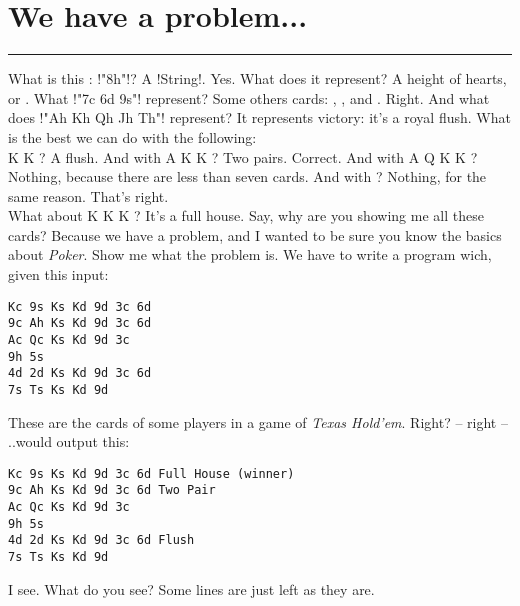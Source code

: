 \newpage
\section{We have a problem...} %
\vspace{10cm}
\hrule

\lhQ What is this : \il!"8h"!?
\lhA A \il!String!.
\lhN Yes. What does it represent?
\lhA A height of hearts, or .
\lhN What \il!"7c 6d 9s"! represent?
\lhA Some others cards: , , and .
\lhN Right. And what does \il!"Ah Kh Qh Jh Th"! represent?
\lhA It represents victory: it's a royal flush.
\lhN What is the best we can do with the following: \\
   \spades K \diamonds K   ?
\lhA A flush.
\lhN And with  \hearts A \spades K \diamonds K   ?
\lhA Two pairs.
\lhN Correct. And with \clubs A \clubs Q \spades K \diamonds K  ?
\lhA Nothing, because there are less than seven cards.
\lhN And with  ?
\lhA Nothing, for the same reason.
\lhN That's right. \\
What about \clubs K  \spades K \diamonds K    ?
\lhA It's a full house. Say, why are you showing me all these cards?
\lhN Because we have a problem, and I wanted to be sure you know the basics about \emph{Poker}.
\lhA Show me what the problem is.
\lhN We have to write a program wich, given this input:
\begin{verbatim}
Kc 9s Ks Kd 9d 3c 6d
9c Ah Ks Kd 9d 3c 6d
Ac Qc Ks Kd 9d 3c
9h 5s
4d 2d Ks Kd 9d 3c 6d
7s Ts Ks Kd 9d
\end{verbatim}
\hspace*{\fill} 
\lhA These are the cards of some players in a game of \emph{Texas Hold'em}. Right?
\lhN -- right -- ..would output this:
\begin{verbatim}
Kc 9s Ks Kd 9d 3c 6d Full House (winner)
9c Ah Ks Kd 9d 3c 6d Two Pair
Ac Qc Ks Kd 9d 3c 
9h 5s 
4d 2d Ks Kd 9d 3c 6d Flush
7s Ts Ks Kd 9d 
\end{verbatim}
\hspace*{\fill} 
\lhA I see. 
\lhN What do you see?
\lhA Some lines are just left as they are. \\
